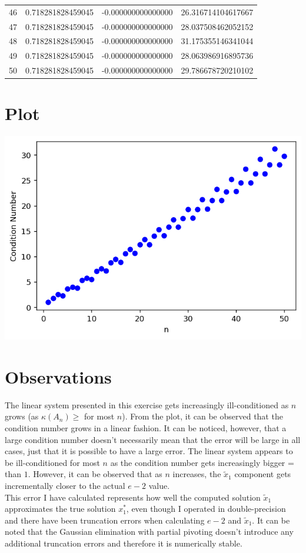\documentclass{article}
\begin{document}
\begin{table}[htb]
\begin{tabular}{c c c c}
46 & 0.718281828459045 & -0.000000000000000 & 26.316714104617667 \\
47 & 0.718281828459045 & -0.000000000000000 & 28.037508462052152 \\
48 & 0.718281828459045 & -0.000000000000000 & 31.175355146341044 \\
49 & 0.718281828459045 & -0.000000000000000 & 28.063986916895736 \\
50 & 0.718281828459045 & -0.000000000000000 & 29.786678720210102 \\\hline %
\end{tabular}
\end{table}

\section{Plot}
\includegraphics[width=\textwidth,height=\textheight,keepaspectratio]{cond_number.png}

\section{Observations}
The linear system presented in this exercise gets increasingly ill-conditioned as $n$ grows (as $\kappa(A_n)\geq$ for most $n$). From the plot, it can be observed that the condition number grows in a linear fashion. It can be noticed, however, that a large condition number doesn’t necessarily mean that the error will be large in all cases, just that it is possible to have a large error. The linear system appears to be ill-conditioned for most $n$ as the condition number gets increasingly bigger = than $1$. However, it can be observed that as $n$ increases, the $\widetilde{x}_1$ component gets incrementally closer to the actual $e-2$ value.\\

This error I have calculated represents how well the computed solution $\widetilde{x}_1$ approximates the true solution $x_1^{\ast}$, even though I operated in double-precision and there have been truncation errors when calculating $e-2$ and $\widetilde{x}_1$. It can be noted that the Gaussian elimination with partial pivoting doesn't introduce any additional truncation errors and therefore it is numerically stable.
\end{document}
